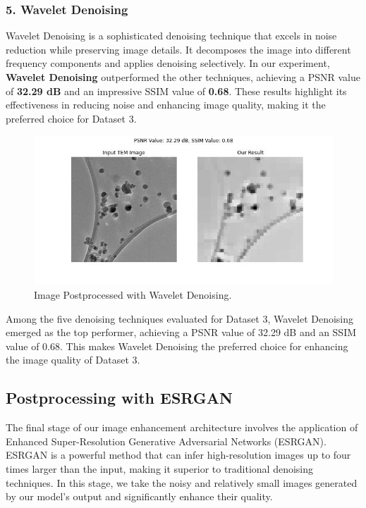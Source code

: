 \subsubsection{5. Wavelet Denoising}
Wavelet Denoising is a sophisticated denoising technique that excels in noise reduction while preserving image details. It decomposes the image into different frequency components and applies denoising selectively. In our experiment,\textbf{ Wavelet Denoising} outperformed the other techniques, achieving a PSNR value of\textbf{ 32.29 dB} and an impressive SSIM value of\textbf{ 0.68}. These results highlight its effectiveness in reducing noise and enhancing image quality, making it the preferred choice for Dataset 3.

\begin{figure}[H]
\centering
\includegraphics[width=.9\textwidth]{img/Dataset_3_with_wavelet.jpg}
\caption{Image Postprocessed with Wavelet Denoising.}\label{fig:Dataset_3_Wavelet_Denoising}
\end{figure}

Among the five denoising techniques evaluated for Dataset 3, Wavelet Denoising emerged as the top performer, achieving a PSNR value of 32.29 dB and an SSIM value of 0.68. This makes Wavelet Denoising the preferred choice for enhancing the image quality of Dataset 3.

\subsection{Postprocessing with ESRGAN}
The final stage of our image enhancement architecture involves the application of Enhanced Super-Resolution Generative Adversarial Networks (ESRGAN). ESRGAN is a powerful method that can infer high-resolution images up to four times larger than the input, making it superior to traditional denoising techniques. In this stage, we take the noisy and relatively small images generated by our model's output and significantly enhance their quality.

